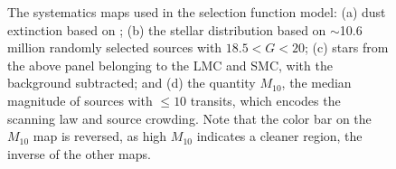 \begin{figure}
    \centering

    \hspace{5ex}
    
    \hspace{5ex}    

    \caption{The systematics maps used in the selection function model: (a) dust extinction based on \cite{schlafly_measuring_2011}; (b) the stellar distribution based on $\sim$10.6 million randomly selected \Gaia sources with $18.5 < G < 20$; (c) stars from the above panel belonging to the LMC and SMC, with the background subtracted; and (d) the quantity $M_{10}$, the median magnitude of sources with $\leq 10$ \Gaia transits, which encodes the scanning law and source crowding. Note that the color bar on the $M_{10}$ map is reversed, as high $M_{10}$ indicates a cleaner region, the inverse of the other maps.}
    \label{fig:systematics}
\end{figure}

